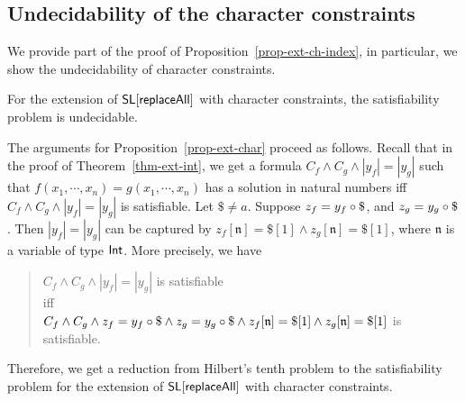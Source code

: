 
\subsection{Undecidability of the character constraints}

We provide part of the proof of Proposition~\ref{prop-ext-ch-index}, in particular, we show the undecidability of character constraints.

\begin{proposition}\label{prop-ext-char}
	For the extension of $\mathsf{SL}[\mathsf{replaceAll}]$ with character constraints, the satisfiability problem is undecidable. 
\end{proposition}

The arguments for Proposition~\ref{prop-ext-char} proceed as follows. Recall that in the proof of Theorem~\ref{thm-ext-int}, we get a formula $C_f \wedge C_g \wedge |y_f| = |y_g|$ such that $f(x_1,\cdots, x_n) = g(x_1,\cdots, x_n)$ has a solution in natural numbers iff $C_f \wedge C_g \wedge |y_f| = |y_g|$ is satisfiable. Let $\$ \neq a$. Suppose  $z_f = y_f \concat \$$, and $z_g = y_g \concat \$$. Then $|y_f| = |y_g|$ can be captured by $z_f[\mathfrak{n}] = \$[1] \wedge  z_g[\mathfrak{n}] = \$[1]$, where $\mathfrak{n}$ is a variable of type ${\sf Int}$. More precisely, 
%
we have 
\begin{quote}
	\centering
	$C_f \wedge C_g \wedge |y_f|= |y_g|$ is satisfiable \\
	iff \\
	$C_f \wedge C_g \wedge z_f = y_f \circ \$ \wedge z_g = y_g \circ \$ \wedge z_f[\mathfrak{n}] = \$[1] \wedge  z_g[\mathfrak{n}] = \$[1]$ is satisfiable. 
\end{quote}
Therefore, we get a reduction from Hilbert's tenth problem to the satisfiability problem for the extension of $\mathsf{SL}[\mathsf{replaceAll}]$ with character constraints. 


